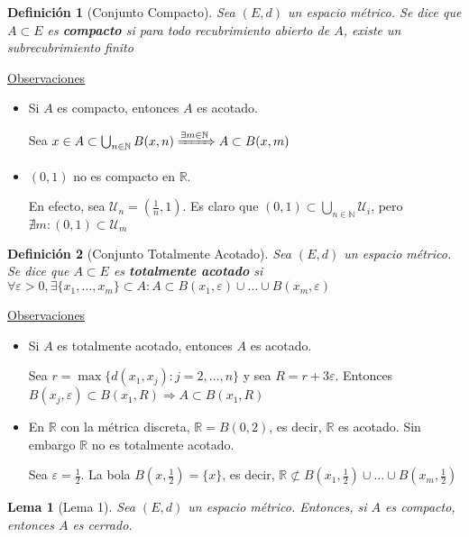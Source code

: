 \documentclass[10pt,a4paper,openright]{book}
\theoremstyle{break}
\newtheorem*{defi}{Definición}
\newtheorem*{lema}{Lema}
\begin{document}
\begin{defi}[Conjunto Compacto]
Sea $(E,d)$ un espacio métrico. Se dice que $A \subset E$ es \textbf{compacto} si para todo recubrimiento abierto de $A$, existe un subrecubrimiento finito
\end{defi}

\underline{Observaciones}

\begin{itemize}
\item Si $A$ es compacto, entonces $A$ es acotado.

Sea $x \in A \subset \bigcup_{n \in \mathbb{N}} B(x,n) \xRightarrow{\exists m \in \mathbb{N}} A \subset B(x,m)$

\item $(0,1)$ no es compacto en $\mathbb{R}$.

En efecto, sea $\mathcal{U}_n = (\frac{1}{n}, 1)$. Es claro que $(0,1) \subset \bigcup_{n \in \mathbb{N}} \mathcal{U}_i$, pero $\nexists m : (0,1) \subset \mathcal{U}_m$

\end{itemize}

\begin{defi}[Conjunto Totalmente Acotado]
Sea $(E,d)$ un espacio métrico. Se dice que $A \subset E$ es \textbf{totalmente acotado} si $\forall \varepsilon >0, \exists \{x_1, \ldots, x_m\} \subset A : A \subset B(x_1, \varepsilon) \cup \ldots \cup B(x_m, \varepsilon)$
\end{defi}

\underline{Observaciones}

\begin{itemize}
\item Si $A$ es totalmente acotado, entonces $A$ es acotado.

Sea $r = \max\{d(x_1, x_j) : j = 2, \ldots, n\}$ y sea $R= r + 3 \varepsilon$. Entonces $B(x_j, \varepsilon) \subset B(x_1, R) \Rightarrow A \subset B(x_1, R)$

\item En $\mathbb{R}$ con la métrica discreta, $\mathbb{R} = B(0,2)$, es decir, $\mathbb{R}$ es acotado. Sin embargo $\mathbb{R}$ no es totalmente acotado.

Sea $\varepsilon = \frac{1}{2}$. La bola $B(x, \frac{1}{2}) = \{x\}$, es decir, $\mathbb{R} \not\subset B(x_1, \frac{1}{2}) \cup \ldots \cup B(x_m, \frac{1}{2})$
\end{itemize}

\begin{lema}[Lema 1]
Sea $(E,d)$ un espacio métrico. Entonces, si $A$ es compacto, entonces $A$ es cerrado.
\end{lema}
\end{document}
